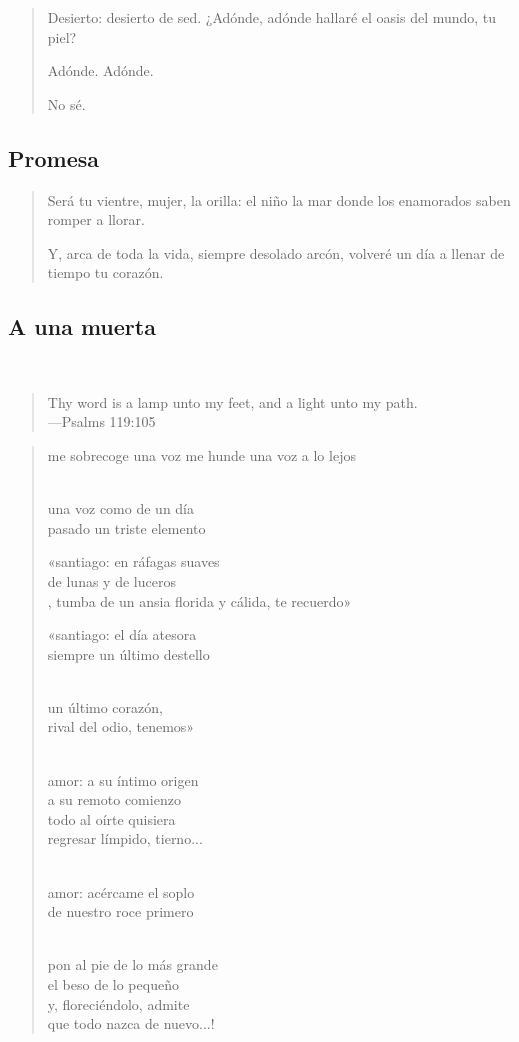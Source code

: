 \documentclass[a4paper, 12pt]{article}
\begin{document}
\begin{verse}
    
Desierto:
desierto de sed.
¿Adónde,
adónde hallaré
el oasis
del mundo, tu piel?

Adónde.
Adónde.

No sé.
\end{verse}

\pagebreak
\subsection{Promesa}

\begin{verse}
Será tu vientre, mujer,
la orilla: el niño la mar
donde los enamorados
saben romper a llorar.
~ 

Y, arca de toda la vida,
siempre desolado arcón,
volveré un día a llenar
de tiempo tu corazón.
\end{verse}

\pagebreak
\subsection{A una muerta}
~ 
\scriptsize
\begin{quote}
    \hspace*{\fill}    Thy word is a lamp unto my feet, 
    and a light unto my path.\\
\hspace*{\fill}—Psalms 119:105
\end{quote}

\normalsize
\begin{verse}
   
me sobrecoge una voz
me hunde una voz a lo lejos \\
~ 

una voz como de un día\\
pasado un triste elemento
~ 

«santiago: en ráfagas suaves\\
de lunas y de luceros\\,
tumba de un ansia florida
y cálida, te recuerdo»
~ 

«santiago: el día atesora\\
siempre un último destello\\
~

un último corazón,\\
rival del odio, tenemos»\\
~

amor: a su íntimo origen\\
a su remoto comienzo\\
todo al oírte quisiera\\
regresar límpido, tierno...\\
~ 

amor: acércame el soplo\\
de nuestro roce primero\\
~

pon al pie de lo más grande\\
el beso de lo pequeño\\
y, floreciéndolo, admite\\
que todo nazca de nuevo...!
\end{verse}
\end{document}
